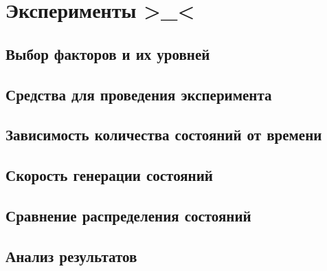 \chapter{Эксперименты >\_<}
\label{cha:experim}

\section{Выбор факторов и их уровней}
\label{sec:experim-strategy}

\section{Средства для проведения эксперимента}
\label{sec:experim-idef0}



\section{Зависимость количества состояний от времени}
\label{sec:space-time}

\section{Скорость генерации состояний}
\label{sec:stategen-speed}

\section{Сравнение распределения состояний}
\label{sec:partition-cmp}

\section{Анализ результатов}
\label{sec:exp-analysis}



